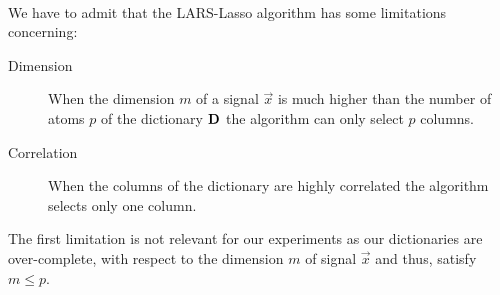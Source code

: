 \paragraph{}
We have to admit that the LARS-Lasso algorithm has some limitations concerning:
\begin{description}
 \item[Dimension] When the dimension $m$ of a signal $\vec{x}$ is much
higher than the number of atoms $p$ of the dictionary $\boldsymbol{\mathrm{D}}$ the algorithm
can only select $p$ columns.
  \item[Correlation] When the columns of the dictionary are highly correlated
the algorithm selects only one column.
\end{description}
The first limitation is not relevant for our experiments as our dictionaries
are over-complete, with respect to the dimension $m$ of signal $\vec{x}$ and
thus, satisfy $m \leq p$. 
